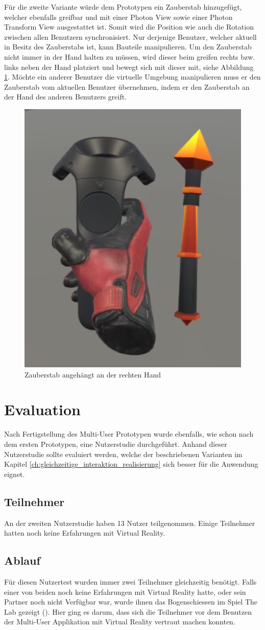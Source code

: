 Für die zweite Variante würde dem Prototypen ein Zauberstab hinzugefügt, welcher ebenfalls greifbar und mit einer Photon View sowie einer Photon Transform View ausgestattet ist. Somit wird die Position wie auch die Rotation zwischen allen Benutzern synchronisiert. Nur derjenige Benutzer, welcher aktuell in Besitz des Zauberstabs ist, kann Bauteile manipulieren. Um den Zauberstab nicht immer in der Hand halten zu müssen, wird dieser beim greifen rechts bzw. links neben der Hand platziert und bewegt sich mit dieser mit, siehe Abbildung \ref{fig:magic_wand}. Möchte ein anderer Benutzer die virtuelle Umgebung manipulieren muss er den Zauberstab vom aktuellen Benutzer übernehmen, indem er den Zauberstab an der Hand des anderen Benutzers greift.

\begin{figure}[h!]
	\centering
	\includegraphics[keepaspectratio,width=0.25\linewidth]{img/MagicWand.PNG}
	\caption{Zauberstab angehängt an der rechten Hand}
	\label{fig:magic_wand}
\end{figure} 

\section{Evaluation}
Nach Fertigstellung des Multi-User Prototypen wurde ebenfalls, wie schon nach dem ersten Prototypen, eine Nutzerstudie durchgeführt. Anhand dieser Nutzerstudie sollte evaluiert werden, welche der beschriebenen Varianten im Kapitel \ref{ch:gleichzeitige_interaktion_realisierung} sich besser für die Anwendung eignet.

\subsection{Teilnehmer}
An der zweiten Nutzerstudie haben 13 Nutzer teilgenommen. Einige Teilnehmer hatten noch keine Erfahrungen mit Virtual Reality.

\subsection{Ablauf}
Für diesen Nutzertest wurden immer zwei Teilnehmer gleichzeitig benötigt. Falls einer von beiden noch keine Erfahrungen mit Virtual Reality hatte, oder sein Partner noch nicht Verfügbar war, wurde ihnen das Bogenschiessen im Spiel \grqq The Lab\grqq{} gezeigt (\cite{noauthor_lab_2019}). Hier ging es darum, dass sich die Teilnehmer vor dem Benutzen der Multi-User Applikation mit Virtual Reality vertraut machen konnten. \\

